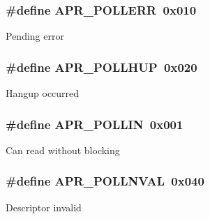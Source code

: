 \subsubsection[{\texorpdfstring{A\+P\+R\+\_\+\+P\+O\+L\+L\+E\+RR}{APR_POLLERR}}]{\setlength{\rightskip}{0pt plus 5cm}\#define A\+P\+R\+\_\+\+P\+O\+L\+L\+E\+RR~0x010}\hypertarget{group__pollopts_ga6f5a72fd9cf3f5dcf174acce0b4b77ee}{}\label{group__pollopts_ga6f5a72fd9cf3f5dcf174acce0b4b77ee}
Pending error 
\subsubsection[{\texorpdfstring{A\+P\+R\+\_\+\+P\+O\+L\+L\+H\+UP}{APR_POLLHUP}}]{\setlength{\rightskip}{0pt plus 5cm}\#define A\+P\+R\+\_\+\+P\+O\+L\+L\+H\+UP~0x020}\hypertarget{group__pollopts_gace76603c4fa4b56f8b5977ff1ceb6f3b}{}\label{group__pollopts_gace76603c4fa4b56f8b5977ff1ceb6f3b}
Hangup occurred 
\subsubsection[{\texorpdfstring{A\+P\+R\+\_\+\+P\+O\+L\+L\+IN}{APR_POLLIN}}]{\setlength{\rightskip}{0pt plus 5cm}\#define A\+P\+R\+\_\+\+P\+O\+L\+L\+IN~0x001}\hypertarget{group__pollopts_ga746222e6b858bc2fc77328d59f78e788}{}\label{group__pollopts_ga746222e6b858bc2fc77328d59f78e788}
Can read without blocking 
\subsubsection[{\texorpdfstring{A\+P\+R\+\_\+\+P\+O\+L\+L\+N\+V\+AL}{APR_POLLNVAL}}]{\setlength{\rightskip}{0pt plus 5cm}\#define A\+P\+R\+\_\+\+P\+O\+L\+L\+N\+V\+AL~0x040}\hypertarget{group__pollopts_ga132da215e207d4685fb467cc64a73f1b}{}\label{group__pollopts_ga132da215e207d4685fb467cc64a73f1b}
Descriptor invalid 

